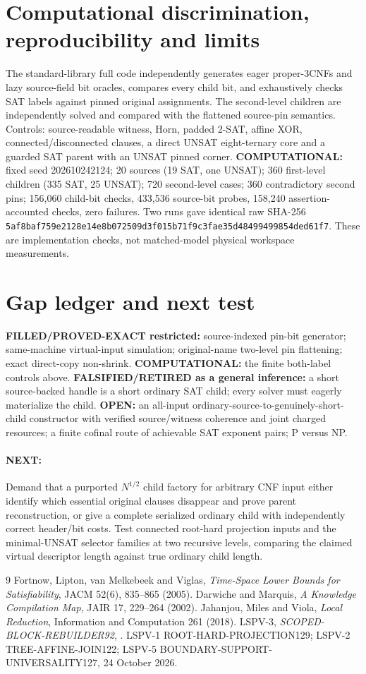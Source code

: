 \documentclass[11pt]{article}
\begin{document}
\section{Computational discrimination, reproducibility and limits}
The standard-library full code independently generates eager proper-3CNFs and lazy source-field bit oracles, compares every child bit, and exhaustively checks SAT labels against pinned original assignments. The second-level children are independently solved and compared with the flattened source-pin semantics. Controls: source-readable witness, Horn, padded 2-SAT, affine XOR, connected/disconnected clauses, a direct UNSAT eight-ternary core and a guarded SAT parent with an UNSAT pinned corner.
\textbf{COMPUTATIONAL:} fixed seed 202610242124; 20 sources (19 SAT, one UNSAT); 360 first-level children (335 SAT, 25 UNSAT); 720 second-level cases; 360 contradictory second pins; 156,060 child-bit checks, 433,536 source-bit probes, 158,240 assertion-accounted checks, zero failures. Two runs gave identical raw SHA-256 \texttt{5af8baf759e2128e14e8b072509d3f015b71f9c3fae35d48499499854ded61f7}. These are implementation checks, not matched-model physical workspace measurements.
\section{Gap ledger and next test}
\textbf{FILLED/PROVED-EXACT restricted:} source-indexed pin-bit generator; same-machine virtual-input simulation; original-name two-level pin flattening; exact direct-copy non-shrink. \textbf{COMPUTATIONAL:} the finite both-label controls above. \textbf{FALSIFIED/RETIRED as a general inference:} a short source-backed handle is a short ordinary SAT child; every solver must eagerly materialize the child. \textbf{OPEN:} an all-input ordinary-source-to-genuinely-short-child constructor with verified source/witness coherence and joint charged resources; a finite cofinal route of achievable SAT exponent pairs; P versus NP.
\paragraph{NEXT:}
Demand that a purported $N^{1/2}$ child factory for arbitrary CNF input either identify which essential original clauses disappear and prove parent reconstruction, or give a complete serialized ordinary child with independently correct header/bit costs. Test connected root-hard projection inputs and the minimal-UNSAT selector families at two recursive levels, comparing the claimed virtual descriptor length against true ordinary child length.
\begin{thebibliography}{9}
 Fortnow, Lipton, van Melkebeek and Viglas, \emph{Time-Space Lower Bounds for Satisfiability}, JACM 52(6), 835--865 (2005).
 Darwiche and Marquis, \emph{A Knowledge Compilation Map}, JAIR 17, 229--264 (2002).
 Jahanjou, Miles and Viola, \emph{Local Reduction}, Information and Computation 261 (2018).
 LSPV-3, \emph{SCOPED-BLOCK-REBUILDER92}, .
 LSPV-1 ROOT-HARD-PROJECTION129; LSPV-2 TREE-AFFINE-JOIN122; LSPV-5 BOUNDARY-SUPPORT-UNIVERSALITY127, 24 October 2026.
\end{thebibliography}
\end{document}
